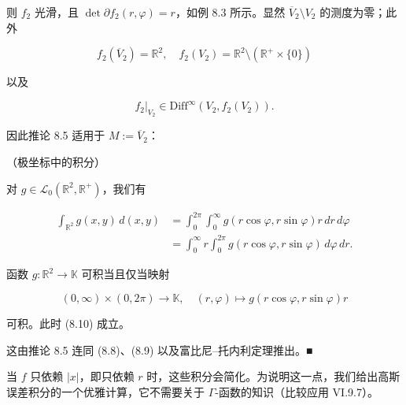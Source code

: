 则 $ f_{2} $ 光滑，且 $ \det \partial f_{2}(r, \varphi) = r $，如例 8.3 所示。显然 $ \overline{V}_{2} \setminus V_{2} $ 的测度为零；此外

\begin{equation}
f_{2}(\overline{V}_{2}) = \mathbb{R}^{2} , \quad f_{2}(V_{2}) = \mathbb{R}^{2} \setminus (\mathbb{R}^{+} \times \{0\})\tag{8.8}
\end{equation}

以及

\begin{equation}
f_{2}|_{V_{2}} \in \mathrm{Diff}^{\infty}(V_{2}, f_{2}(V_{2})) .\tag{8.9}
\end{equation}

因此推论 8.5 适用于 $ M := \overline{V}_{2} $：

\begin{proposition}

（极坐标中的积分）

\begin{subitems}
\item

对 $ g \in \mathcal{L}_{0}(\mathbb{R}^{2}, \mathbb{R}^{+}) $，我们有

\begin{equation}
\begin{aligned}
\int_{\mathbb{R}^{2}} g(x, y) \, d(x, y) &= \int_{0}^{2\pi} \int_{0}^{\infty} g(r \cos\varphi, r \sin\varphi) r \, dr \, d\varphi \\ &= \int_{0}^{\infty} r \int_{0}^{2\pi} g(r \cos\varphi, r \sin\varphi) \, d\varphi \, dr .
\end{aligned}\tag{8.10}
\end{equation}
\item

函数 $ g : \mathbb{R}^{2} \to \mathbb{K} $ 可积当且仅当映射

\[
(0, \infty) \times (0, 2\pi) \to \mathbb{K} , \quad (r, \varphi) \mapsto g(r \cos\varphi, r \sin\varphi) r
\]

可积。此时 (8.10) 成立。

\proofhead
这由推论 8.5 连同 (8.8)、(8.9) 以及富比尼–托内利定理推出。\nobreak\hspace{0.35em}■
\end{subitems}

\end{proposition}

当 $ f $ 只依赖 $ |x| $，即只依赖 $ r $ 时，这些积分会简化。为说明这一点，我们给出高斯误差积分的一个优雅计算，它不需要关于 $ \Gamma $-函数的知识（比较应用 VI.9.7）。

